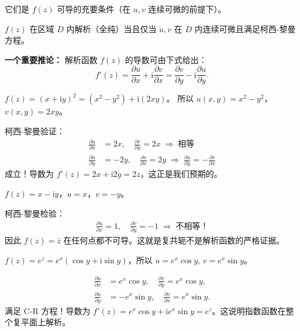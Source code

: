 它们是 $f(z)$ 可导的充要条件（在 $u,v$ 连续可微的前提下）。

\begin{theorem}
$f(z)$ 在区域 $D$ 内解析（全纯）当且仅当 $u,v$ 在 $D$ 内连续可微且满足柯西-黎曼方程。
\end{theorem}

\textbf{一个重要推论：} 解析函数 $f(z)$ 的导数可由下式给出：
\begin{equation}
f'(z) = \frac{\partial u}{\partial x} + \mathrm{i}\frac{\partial v}{\partial x}
= \frac{\partial v}{\partial y} - \mathrm{i}\frac{\partial u}{\partial y}.
\label{eq:complex_derivative}
\end{equation}

\begin{example}[验证柯西-黎曼方程：$f(z)=z^2$]
$f(z) = (x+\mathrm{i}y)^2 = (x^2-y^2) + \mathrm{i}(2xy)$。
所以 $u(x,y)=x^2-y^2$，$v(x,y)=2xy$。

柯西-黎曼验证：
\begin{align*}
\frac{\partial u}{\partial x} &= 2x,\quad \frac{\partial v}{\partial y} = 2x \;\Rightarrow\; \text{相等}\\
\frac{\partial u}{\partial y} &= -2y,\quad \frac{\partial v}{\partial x} = 2y \;\Rightarrow\; \frac{\partial u}{\partial y} = -\frac{\partial v}{\partial x}
\end{align*}
成立！导数为 $f'(z) = 2x + \mathrm{i}2y = 2z$，这正是我们预期的。
\end{example}

\begin{example}[反例：$f(z)=\bar{z}$ 处处不可导]
$f(z) = x - \mathrm{i}y$，$u=x$，$v=-y$。

柯西-黎曼检验：
\begin{align*}
\frac{\partial u}{\partial x} = 1,\quad \frac{\partial v}{\partial y} = -1 \;\Rightarrow\; \text{不相等！}
\end{align*}
因此 $f(z)=\bar{z}$ 在任何点都不可导。这就是复共轭不是解析函数的严格证据。
\end{example}

\begin{example}[指数函数的解析性验证]
$f(z) = e^z = e^x(\cos y + \mathrm{i}\sin y)$，所以 $u=e^x\cos y$, $v=e^x\sin y$。

\begin{align*}
\frac{\partial u}{\partial x} &= e^x\cos y,\quad \frac{\partial v}{\partial y} = e^x\cos y,\\
\frac{\partial u}{\partial y} &= -e^x\sin y,\quad \frac{\partial v}{\partial x} = e^x\sin y.
\end{align*}
满足 C-R 方程！导数为 $f'(z) = e^x\cos y + \mathrm{i}e^x\sin y = e^z$。这说明指数函数在整个复平面上解析。
\end{example}

